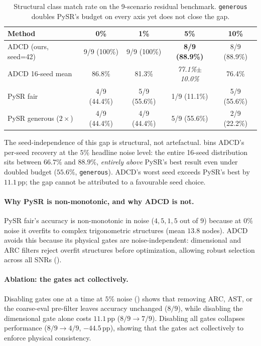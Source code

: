\documentclass{article}
\begin{document}
\begin{table}[h]
\centering
\small
\caption{Structural class match rate on the 9-scenario residual benchmark. \texttt{generous} doubles PySR's budget on every axis yet does not close the gap.}
\label{tab:baseline}
\begin{tabular}{lcccc}
\toprule
\textbf{Method} & \textbf{0\%} & \textbf{1\%} & \textbf{5\%} & \textbf{10\%} \\
\midrule
ADCD (ours, seed=42) & 9/9 (100\%) & 9/9 (100\%) & \textbf{8/9 (88.9\%)} & 8/9 (88.9\%) \\
ADCD 16-seed mean    & 86.8\% & 81.3\% & \textit{77.1\%$\pm$10.0\%} & 76.4\% \\
PySR fair            & 4/9 (44.4\%) & 5/9 (55.6\%) & 1/9 (11.1\%) & 5/9 (55.6\%) \\
PySR generous ($2\times$) & 4/9 (44.4\%) & 4/9 (44.4\%) & 5/9 (55.6\%) & 2/9 (22.2\%) \\
\bottomrule
\end{tabular}
\end{table}

The seed-independence of this gap is structural, not artefactual.  bins ADCD's per-seed recovery at the $5\%$ headline noise level: the entire 16-seed distribution sits between $66.7\%$ and $88.9\%$, \emph{entirely above} PySR's best result even under doubled budget ($55.6\%$, \texttt{generous}). ADCD's worst seed exceeds PySR's best by $11.1$\,pp; the gap cannot be attributed to a favourable seed choice.

\paragraph{Why PySR is non-monotonic, and why ADCD is not.}
PySR fair's accuracy is non-monotonic in noise ($4,5,1,5$ out of 9) because at $0\%$ noise it overfits to complex trigonometric structures (mean $13.8$ nodes). ADCD avoids this because its physical gates are noise-independent: dimensional and ARC filters reject overfit structures before optimization, allowing robust selection across all SNRs ().

\paragraph{Ablation: the gates act collectively.}
Disabling gates one at a time at $5\%$ noise () shows that removing ARC, AST, or the coarse-eval pre-filter leaves accuracy unchanged ($8/9$), while disabling the dimensional gate alone costs $11.1$\,pp ($8/9\to7/9$). Disabling all gates collapses performance ($8/9\to4/9$, $-44.5$\,pp), showing that the gates act collectively to enforce physical consistency.
\end{document}
